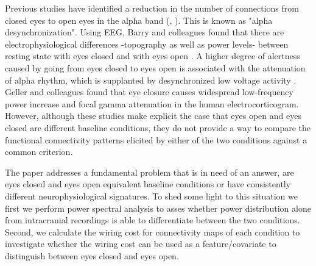 \documentclass[11pt, onecolumn]{article}
\begin{document}
Previous studies have identified a reduction in the number of connections from closed eyes to open eyes in the alpha band (\citep{tan2013difference}, \citep{barry2007eeg}). This is known as  "alpha desynchronization". Using EEG, Barry and colleagues found that there are electrophysiological differences -topography as well as power levels- between resting state with eyes closed and with eyes open \citep{barry2007eeg}.  
A higher degree of alertness caused by going from eyes closed to eyes open is associated with the attenuation of alpha rhythm, which is supplanted by desynchronized low voltage activity \citep{niedermeyer2005electroencephalography}.
Geller and colleagues \citep{geller2014eye} found that eye closure causes widespread low-frequency power increase and focal gamma attenuation in the human electrocorticogram. 
However, although these studies make explicit the case that eyes open and eyes closed are different baseline conditions, they do not provide a way to compare the functional connectivity patterns elicited by either of the two conditions against a common criterion.

The paper addresses a fundamental problem that is in need of an answer, are eyes closed and eyes open equivalent baseline conditions or have consistently different neurophysiological signatures. To shed some light to this situation we first  we perform power spectral analysis to asses whether power distribution alone from intracranial recordings is able to differentiate between the two conditions. Second, we calculate the wiring cost for connectivity maps of each condition to investigate whether the wiring cost can be used as a feature/covariate to distinguish between eyes closed and eyes open. 
\end{document}
